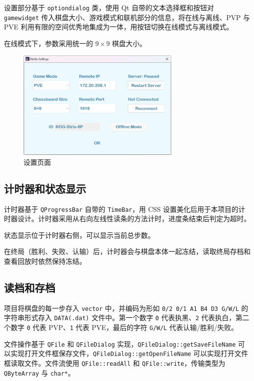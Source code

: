 \documentclass{noithesis}
\begin{document}
	设置部分基于 \verb|optiondialog| 类，使用 Qt 自带的文本选择框和按钮对 \verb|gamewidget| 传入棋盘大小、游戏模式和联机部分的信息，将在线与离线、PVP 与 PVE 利用有限的空间优秀地集成为一体，用按钮切换在线模式与离线模式。
	
	在线模式下，参数采用统一的 $9\times 9$ 棋盘大小。
		
	\begin{figure}[!htb]{
			\centering
			\includegraphics[width=8cm]{img/web1.png}
			\caption{设置页面}
		}
	\end{figure}
	
	\subsection{计时器和状态显示}
	
	计时器基于 \verb|QProgressBar| 自带的 \verb|TimeBar|，用 CSS 设置美化后用于本项目的计时器设计。计时器采用从右向左线性读条的方法计时，进度条结束后判定为超时。
	
	状态显示位于计时器右侧，可以显示当前总步数。
	
	在终局（胜利、失败、认输）后，计时器会与棋盘本体一起冻结，读取终局存档和查看回放时依然保持冻结。
	
	\subsection{读档和存档}
	
	项目将棋盘的每一步存入 \verb|vector| 中，并编码为形如 \verb|0/2 0/1 A1 B4 D3 G/W/L| 的字符串形式存入 \verb|DATA(.dat)| 文件中。第一个数字 \verb|0| 代表执黑、\verb|2| 代表执白，第二个数字 \verb|0| 代表 PVP、\verb|1| 代表 PVE，最后的字符 \verb|G/W/L| 代表认输/胜利/失败。
	
	文件操作基于 \verb|QFile| 和 \verb|QFileDialog| 实现，\verb|QFileDialog::getSaveFileName| 可以实现打开文件框保存文件，\verb|QFileDialog::getOpenFileName| 可以实现打开文件框读取文件。文件流使用 \verb|QFile::readAll| 和 \verb|QFile::write|，传输类型为 \verb|QByteArray| 与 \verb|char*|。
	
\end{document}
